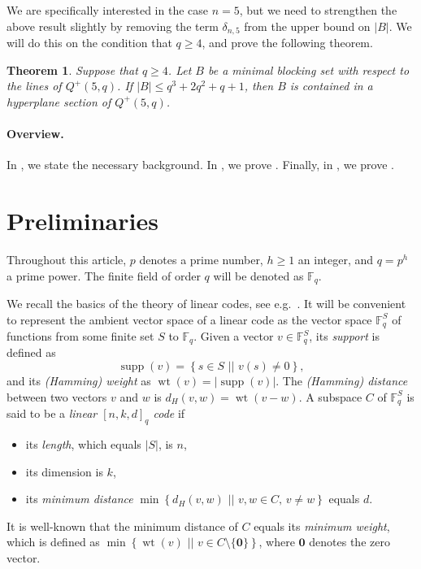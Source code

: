 \documentclass[a4paper]{article}
\newtheorem{thm}{Theorem}[section]
\theoremstyle{definition}
\newcommand{\FF}{\mathbb F}
\newcommand{\sett}[2]{ \left\{ #1 \, \, || \, \, #2 \right \} }
\newcommand{\zero}{\mathbf 0}
\DeclareMathOperator{\supp}{supp}
\DeclareMathOperator{\wt}{wt}
\begin{document}
We are specifically interested in the case $n=5$, but we need to strengthen the above result slightly by removing the term $\delta_{n,5}$ from the upper bound on $|B|$.
We will do this on the condition that $q \geq 4$, and prove the following theorem.

\begin{thm}
 \label{Thm:Main:Klein}
 Suppose that $q \geq 4$.
 Let $B$ be a minimal blocking set with respect to the lines of $Q^+(5,q)$.
 If $|B| \leq q^3+2q^2+q+1$, then $B$ is contained in a hyperplane section of $Q^+(5,q)$.
\end{thm}

\paragraph{Overview.} In , we state the necessary background.
In , we prove .
Finally, in , we prove .

\section{Preliminaries}
 \label{Sec:Prel}

Throughout this article, $p$ denotes a prime number, $h\geq1$ an integer, and $q = p^h$ a prime power.
The finite field of order $q$ will be denoted as $\FF_q$.

\bigskip

We recall the basics of the theory of linear codes, see e.g.\ \cite[\S 3]{vanLint99}.
It will be convenient to represent the ambient vector space of a linear code as the vector space $\FF_q^S$ of functions from some finite set $S$ to $\FF_q$.
Given a vector $v \in \FF_q^S$, its \emph{support} is defined as
\[
 \supp(v) = \sett{ s \in S }{ v(s) \neq 0 },
\]
and its \emph{(Hamming) weight} as $\wt(v) = |\supp(v)|$.
The \emph{(Hamming) distance} between two vectors $v$ and $w$ is $d_H(v,w) = \wt(v-w)$.
A subspace $C$ of $\FF_q^S$ is said to be a \emph{linear $[n,k,d]_q$ code} if
\begin{itemize}
 \item its \emph{length}, which equals $|S|$, is $n$,
 \item its dimension is $k$,
 \item its \emph{minimum distance} $\min \sett{d_H(v,w)}{ v,w \in C, \, v \neq w}$ equals $d$.
\end{itemize}
It is well-known that the minimum distance of $C$ equals its \emph{minimum weight}, which is defined as $\min \sett{ \wt(v) }{ v \in C \setminus \{\zero\} }$, where $\zero$ denotes the zero vector.
\end{document}

